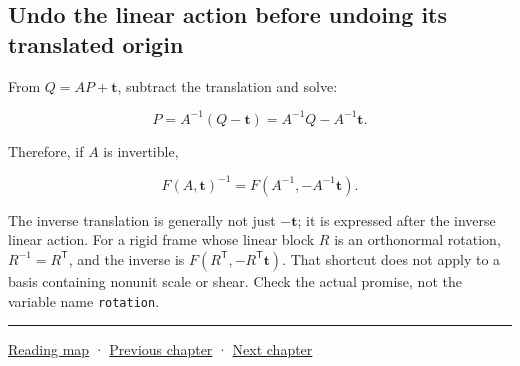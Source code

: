 \subsection{Undo the linear action before undoing its translated origin}\label{01-foundations-i-ch018-undo-the-linear-action-before-undoing-its-translated-origin}

From \(Q=AP+\mathbf t\), subtract the translation and solve:

\[
P=A^{-1}(Q-\mathbf t)=A^{-1}Q-A^{-1}\mathbf t.
\]

Therefore, if \(A\) is invertible,

\[
F(A,\mathbf t)^{-1}
=F(A^{-1},-A^{-1}\mathbf t).
\]

The inverse translation is generally not just \(-\mathbf t\); it is expressed after the inverse linear action. For a rigid frame whose linear block \(R\) is an orthonormal rotation, \(R^{-1}=R^{\mathsf T}\), and the inverse is \(F(R^{\mathsf T},-R^{\mathsf T}\mathbf t)\). That shortcut does not apply to a basis containing nonunit scale or shear. Check the actual promise, not the variable name \texttt{rotation}.

\begin{center}\rule{0.5\linewidth}{0.5pt}\end{center}

\hyperref[volume-reading-map]{Reading map} · \hyperref[01-foundations-i-ch017]{Previous chapter} · \hyperref[01-foundations-i-ch019]{Next chapter}
